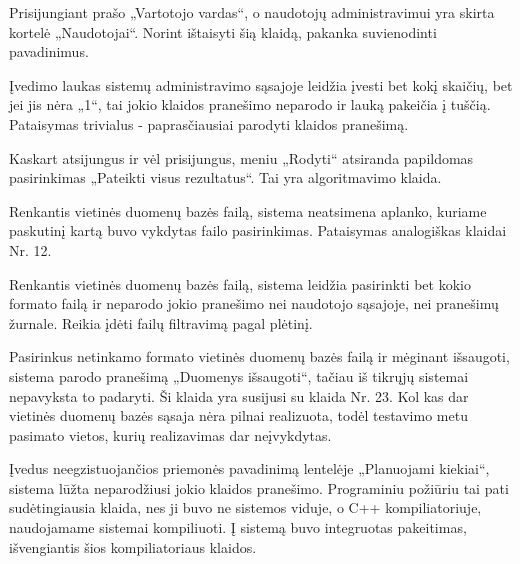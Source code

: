 {
  Prisijungiant prašo „Vartotojo vardas“, o naudotojų administravimui
  yra skirta kortelė „Naudotojai“.
}
{
  Norint ištaisyti šią klaidą, pakanka suvienodinti pavadinimus.
}

{
  Įvedimo laukas sistemų administravimo sąsajoje leidžia įvesti bet kokį
  skaičių, bet jei jis nėra „1“, tai jokio klaidos pranešimo neparodo ir lauką
  pakeičia į tuščią.
}
{
  Pataisymas trivialus - paprasčiausiai parodyti klaidos pranešimą.
}

{
  Kaskart atsijungus ir vėl prisijungus, meniu „Rodyti“ atsiranda papildomas
  pasirinkimas „Pateikti visus rezultatus“.
}
{
  Tai yra algoritmavimo klaida.
}

{
  Renkantis vietinės duomenų bazės failą, sistema neatsimena aplanko,
  kuriame paskutinį kartą buvo vykdytas failo pasirinkimas.
}
{
  Pataisymas analogiškas klaidai Nr. 12.
}

{
  Renkantis vietinės duomenų bazės failą, sistema leidžia pasirinkti
  bet kokio formato failą ir neparodo jokio pranešimo nei naudotojo sąsajoje,
  nei pranešimų žurnale.
}
{
  Reikia įdėti failų filtravimą pagal plėtinį.
}

{
  Pasirinkus netinkamo formato vietinės duomenų bazės failą ir mėginant
  išsaugoti, sistema parodo pranešimą „Duomenys išsaugoti“, tačiau iš tikrųjų
  sistemai nepavyksta to padaryti.
}
{
  Ši klaida yra susijusi su klaida Nr. 23. Kol kas dar vietinės duomenų bazės
  sąsaja nėra pilnai realizuota, todėl testavimo metu pasimato vietos, kurių
  realizavimas dar neįvykdytas.
}

{
  Įvedus neegzistuojančios priemonės pavadinimą lentelėje „Planuojami kiekiai“,
  sistema lūžta neparodžiusi jokio klaidos pranešimo.
}
{
  Programiniu požiūriu tai pati sudėtingiausia klaida, nes ji buvo ne sistemos viduje,
  o C++ kompiliatoriuje, naudojamame sistemai kompiliuoti. Į sistemą buvo integruotas
  pakeitimas, išvengiantis šios kompiliatoriaus klaidos.
}
